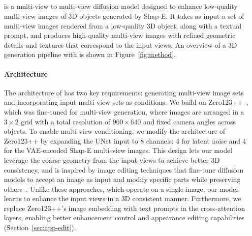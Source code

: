 \vspace{-3pt}
\subsection{\ourname}
\vspace{-3pt}
\ourname{} is a multi-view to multi-view diffusion model designed to enhance low-quality multi-view images of 3D objects generated by Shap-E. It takes as input a set of multi-view images rendered from a low-quality 3D object, along with a textual prompt, and produces high-quality multi-view images with refined geometric details and textures that correspond to the input views.
An overview of a 3D generation pipeline with \ourname{} is shown in Figure~\ref{fig:method}.

\paragraph{Architecture}
The architecture of \ourname{} has two key requirements: generating multi-view image sets and incorporating input multi-view sets as conditions. We build on Zero123++~\cite{shi2023zero123singleimageconsistent, xu2024instantmesh}, which was fine-tuned for multi-view generation, where images are arranged in a $3\times2$ grid with a total resolution of $960\times640$ and fixed camera angles across objects.
%
To enable multi-view conditioning, we modify the architecture of Zero123++ by expanding the UNet input to 8 channels: 4 for latent noise and 4 for the VAE-encoded Shap-E multi-view images. This design lets our model leverage the coarse geometry from the input views to achieve better 3D consistency, and is inspired by image editing techniques that fine-tune diffusion models to accept an image as input and modify specific parts while preserving others~\cite{brooks2022instructpix2pix, rombach2022highresolutionimagesynthesislatent, yang2022paint}. Unlike these approaches, which operate on a single image, our model learns to enhance the input views in a 3D consistent manner. 
Furthermore, we replace Zero123++'s image embedding with text prompts in the cross-attention layers, enabling better enhancement control and appearance editing capabilities (Section~\ref{sec:app-edit}).


